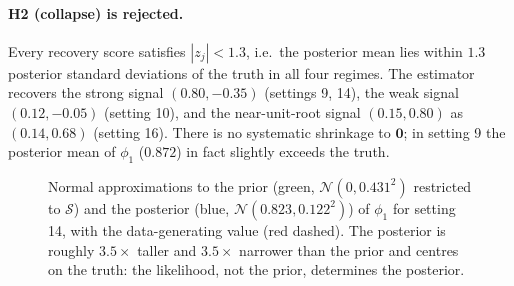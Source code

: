 \documentclass[11pt]{article}
\theoremstyle{definition}
\newcommand{\Norm}{\mathcal{N}}
\newcommand{\Stab}{\mathcal{S}}
\begin{document}
\paragraph{H2 (collapse) is rejected.} Every recovery score satisfies
$|z_j|<1.3$, i.e.\ the posterior mean lies within $1.3$ posterior standard
deviations of the truth in all four regimes. The estimator recovers the strong
signal $(0.80,-0.35)$ (settings 9, 14), the weak signal $(0.12,-0.05)$
(setting 10), and the near-unit-root signal $(0.15,0.80)$ as $(0.14,0.68)$
(setting 16). There is no systematic shrinkage to $\bm 0$; in setting 9 the
posterior mean of $\phi_1$ ($0.872$) in fact slightly exceeds the truth.

\begin{figure}[h]
\centering
{}
\caption{Normal approximations to the prior (green, $\Norm(0,0.431^2)$ restricted
to $\Stab$) and the posterior (blue, $\Norm(0.823,0.122^2)$) of $\phi_1$ for
setting 14, with the data-generating value (red dashed). The posterior is roughly
$3.5\times$ taller and $3.5\times$ narrower than the prior and centres on the
truth: the likelihood, not the prior, determines the posterior.}
\label{fig:overlay}
\end{figure}
\end{document}
